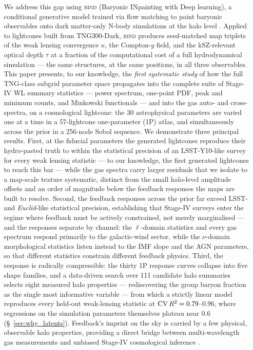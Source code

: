 \documentclass[linenumbers,trackchanges, twocolumn]{aastex701}
\begin{document}
We address this gap using \textsc{bind} (Baryonic INpainting with Deep
learning), a conditional generative model trained via flow matching to paint
baryonic observables onto dark matter-only N-body simulations at the halo
level \citep{Lee-2026b}.
Applied to lightcones built from TNG300-Dark, \textsc{bind} produces
seed-matched map triplets of the weak lensing convergence $\kappa$, the
Compton-$y$ field, and the kSZ-relevant optical depth $\tau$ at a fraction of
the computational cost of a full hydrodynamical simulation --- the same
structures, at the same positions, in all three observables.
This paper presents, to our knowledge, the \emph{first systematic study} of
how the full TNG-class subgrid parameter space propagates into the complete
suite of Stage-IV WL summary statistics --- power spectrum, one-point PDF,
peak and minimum counts, and Minkowski functionals --- and into the gas auto-
and cross-spectra, on a cosmological lightcone: the 30 astrophysical
parameters are varied one at a time in a 57-lightcone one-parameter (1P)
atlas, and simultaneously across the prior in a 256-node Sobol sequence.
We demonstrate three principal results.
First, at the fiducial parameters the generated lightcones reproduce their
hydro-pasted truth to within the statistical precision of an LSST-Y10-like
survey for every weak lensing statistic --- to our knowledge, the first
generated lightcones to reach this bar --- while the gas spectra carry larger
residuals that we isolate to a map-scale texture systematic, distinct from
the small halo-level amplitude offsets and an order of magnitude below the
feedback responses the maps are built to resolve.
Second, the feedback responses across the prior far exceed LSST- and
\textit{Euclid}-like statistical precision, establishing that Stage-IV
surveys enter the regime where feedback must be actively constrained, not
merely marginalised --- and the responses separate by channel: the
$\ell$-domain statistics and every gas spectrum respond primarily to the
galactic-wind sector, while the $\nu$-domain morphological statistics listen
instead to the IMF slope and the AGN parameters, so that different statistics
constrain different feedback physics.
Third, the response is radically compressible: the thirty 1P response curves
collapse into five shape families, and a data-driven search over 111
candidate halo summaries selects eight measured halo properties ---
rediscovering the \citet{vanDaalen-2020} group baryon fraction as the single
most informative variable --- from which a strictly linear model reproduces
every held-out weak-lensing statistic at ${\rm CV}\,R^2 = 0.79$--$0.96$,
where regressions on the simulation parameters themselves plateau near
$0.6$ (\S~\ref{sec:why_latents}).
Feedback's imprint on the sky is carried by a few physical, observable halo
properties, providing a direct bridge between multi-wavelength gas
measurements \citep{Siegel-2025,Bigwood-2025} and unbiased Stage-IV
cosmological inference \citep{vanDaalen-2020,Schneider-2022}.
\end{document}
